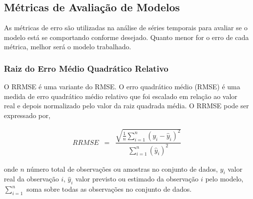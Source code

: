 \subsection{M\'etricas de Avalia\c c\~ao de Modelos}\label{subsec:metrica}

As métricas de erro são utilizadas na análise de séries temporais para avaliar se o modelo está se comportando conforme desejado. Quanto menor for o erro de cada métrica, melhor será o modelo trabalhado.

%
%

%
%
%
%
%

\subsubsection{Raiz do Erro M\'edio Quadr\'atico Relativo}\label{subsub:rrmse}

O RRMSE é uma variante do RMSE. O erro quadrático médio (RMSE) é uma medida de erro quadrático médio relativo que foi escalado em relação ao valor real e depois normalizado pelo valor da raiz quadrada média.  O RRMSE pode ser expressado por,

\begin{eqnarray}
	R R M S E&=&\dfrac{\sqrt{\frac{1}{n} \sum_{i=1}^n\left(y_i-\hat{y}_i\right)^2}}{\sum_{i=1}^n\left(\hat{y}_i\right)^2}
\end{eqnarray}

\noindent onde \(n\) número total de observações ou amostras no conjunto de dados,
\(y_i\) valor real da observação \(i\),
\(\hat{y}_i\) valor previsto ou estimado da observação \(i\) pelo modelo,
\(\sum_{i=1}^{n}\) soma sobre todas as observações no conjunto de dados.

